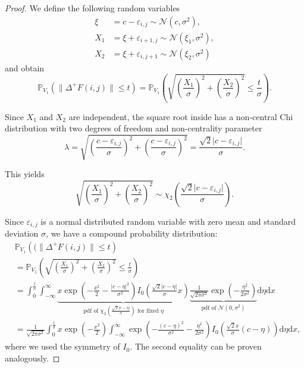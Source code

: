 \documentclass[a4paper,12pt]{article}
\newcommand{\abs}[1]{\lvert#1\rvert}
\newcommand{\norm}[1]{\lVert#1\rVert}
\theoremstyle{plain}
\theoremstyle{definition}
\numberwithin{equation}{section}
\begin{document}
\begin{proof}
	We define the following random variables
	\begin{align*}
		\xi &= c - \varepsilon_{i, j} \sim \mathcal{N}\left( c, \sigma^2 \right), \\
		X_1 &= \xi + \varepsilon_{i + 1, j} \sim \mathcal{N}\left( \xi_1, \sigma^2 \right), \\
		X_2 &= \xi + \varepsilon_{i, j + 1} \sim \mathcal{N}\left( \xi_2, \sigma^2 \right)
	\end{align*}
	and obtain
	\begin{equation*}
		\mathbb{P}_{V_1}\left( \norm{\Delta^+ F(i, j)} \leq t \right) = \mathbb{P}_{V_1}\left( \sqrt{\left( \frac{X_1}{\sigma} \right)^2 + \left( \frac{X_2}{\sigma} \right)^2} \leq \frac{t}{\sigma} \right).
	\end{equation*}
	
	Since $X_1$ and $X_2$ are independent, the square root inside has a non-central Chi distribution with two degrees of freedom and non-centrality parameter
	\begin{equation*}
		\lambda = \sqrt{\left( \frac{c - \varepsilon_{i, j}}{\sigma} \right)^2 + \left( \frac{c - \varepsilon_{i, j}}{\sigma} \right)^2} = \frac{\sqrt{2} \abs{c - \varepsilon_{i, j}}}{\sigma}.
	\end{equation*}
	
	This yields
	\begin{equation*}
		\sqrt{\left( \frac{X_1}{\sigma} \right)^2 + \left( \frac{X_2}{\sigma} \right)^2} \sim \chi_2 \left( \frac{\sqrt{2} \abs{c - \varepsilon_{i, j}}}{\sigma} \right).
	\end{equation*}
	
	Since $\varepsilon_{i, j}$ is a normal distributed random variable with zero mean and standard deviation $\sigma$, we have a compound probability distribution:
	\begin{align*}
		&\mathbb{P}_{V_1}\left(( \norm{\Delta^+ F(i, j)} \leq t \right) \\
		&= \mathbb{P}_{V_1}\left( \sqrt{\left( \frac{X_1}{\sigma} \right)^2 + \left( \frac{X_2}{\sigma} \right)^2} \leq \frac{t}{\sigma} \right) \\
		&= \int_0^\frac{t}{\sigma} \int_{-\infty}^\infty \underbrace{x \exp \left( - \frac{x^2}{2} - \frac{\abs{c - \eta}^2}{\sigma^2} \right) I_0 \left( \frac{\sqrt{2} \abs{c - \eta}}{\sigma} x \right)}_{\textrm{pdf of } \chi_2 \left( \frac{\sqrt{2} \abs{c - \eta}}{\sigma} \right) \textrm{ for fixed } \eta} \underbrace{\frac{1}{\sqrt{2 \pi \sigma^2}} \exp \left( - \frac{\eta^2}{2 \sigma^2} \right)}_{\textrm{pdf of } \mathcal{N}(0, \sigma^2)} \mathrm{d}\eta \mathrm{d}x \\
		&= \frac{1}{\sqrt{2 \pi \sigma^2}} \int_0^\frac{t}{\sigma} x \exp \left( - \frac{x^2}{2} \right) \int_{-\infty}^\infty \exp \left( - \frac{(c - \eta)^2}{\sigma^2} - \frac{\eta^2}{2 \sigma^2} \right) I_0 \left( \frac{\sqrt{2} x}{\sigma} (c - \eta) \right) \mathrm{d}\eta \mathrm{d}x,
	\end{align*}
	where we used the symmetry of $I_0$. The second equality can be proven analogously.
\end{proof}
\end{document}
